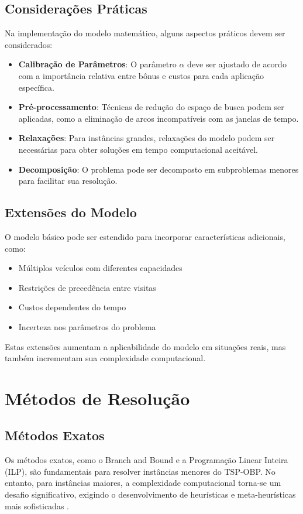 \documentclass[12pt, a4paper]{report}
\begin{document}
\section{Considerações Práticas}
Na implementação do modelo matemático, alguns aspectos práticos devem ser considerados:

\begin{itemize}
    \item \textbf{Calibração de Parâmetros}: O parâmetro $\alpha$ deve ser ajustado de acordo com a importância relativa entre bônus e custos para cada aplicação específica.
    
    \item \textbf{Pré-processamento}: Técnicas de redução do espaço de busca podem ser aplicadas, como a eliminação de arcos incompatíveis com as janelas de tempo.
    
    \item \textbf{Relaxações}: Para instâncias grandes, relaxações do modelo podem ser necessárias para obter soluções em tempo computacional aceitável.
    
    \item \textbf{Decomposição}: O problema pode ser decomposto em subproblemas menores para facilitar sua resolução.
\end{itemize}

\section{Extensões do Modelo}
O modelo básico pode ser estendido para incorporar características adicionais, como:

\begin{itemize}
    \item Múltiplos veículos com diferentes capacidades
    \item Restrições de precedência entre visitas
    \item Custos dependentes do tempo
    \item Incerteza nos parâmetros do problema
\end{itemize}

Estas extensões aumentam a aplicabilidade do modelo em situações reais, mas também incrementam sua complexidade computacional.

\chapter{Métodos de Resolução}

\section{Métodos Exatos}
Os métodos exatos, como o Branch and Bound e a Programação Linear Inteira (ILP), são fundamentais para resolver instâncias menores do TSP-OBP. No entanto, para instâncias maiores, a complexidade computacional torna-se um desafio significativo, exigindo o desenvolvimento de heurísticas e meta-heurísticas mais sofisticadas \cite{lopesfilho2019, carvalho2022}.
\end{document}

